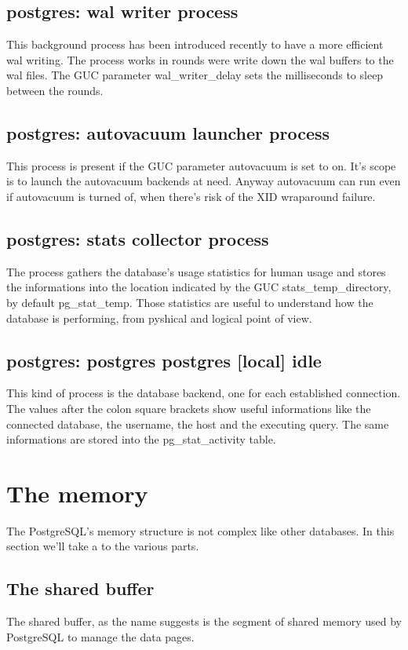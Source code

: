 \subsection{postgres: wal writer process}
This background process has been introduced recently to have a more efficient 
wal writing. The process works in rounds were write down the wal buffers to the 
wal files. The GUC parameter wal\_writer\_delay sets 
the milliseconds to sleep between the rounds. 

\subsection{postgres: autovacuum launcher process}
This process is present if the GUC parameter autovacuum is set to on.
It's scope is to launch the autovacuum backends at need.
Anyway autovacuum can run even if autovacuum is turned of, when there's risk 
of the XID wraparound failure.

\subsection{postgres: stats collector process}
The process gathers the database's usage statistics for human usage and stores 
the informations into the location indicated by the GUC stats\_temp\_directory, 
by default pg\_stat\_temp. Those statistics are useful to understand 
how the database is performing, from pyshical and logical point of view.

\subsection{postgres: postgres postgres [local] idle}
This kind of process is the database backend, one for each established 
connection. The values after the colon square brackets show useful 
informations like the connected database, the username, the host and the 
executing query. The same informations are stored into the pg\_stat\_activity 
table.


\section{The memory}
\label{sec:MEMORY}
The PostgreSQL's memory structure is not complex like other databases.
In this section we'll take a to the various parts. 

\subsection{The shared buffer}
The shared buffer, as the name suggests is the segment of shared memory used by 
PostgreSQL to manage the data pages. 


